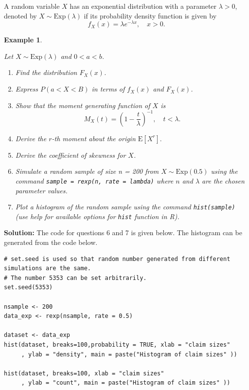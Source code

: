 \documentclass[landscape, 20pt]{extreport}
\theoremstyle{definition}
\theoremstyle{definition}
\newtheorem{example}{Example}[chapter]
\theoremstyle{definition}
\theoremstyle{definition}
\theoremstyle{remark}
\begin{document}
A random variable \(X\) has an exponential distribution with a parameter
\(\lambda > 0\), denoted by \(X \sim \text{Exp}(\lambda)\) if its
probability density function is given by
\[f_X(x) = \lambda e^{-\lambda x}, \quad x > 0.\]

\begin{example}
\protect\hypertarget{exm:unlabeled-div-28}{}\label{exm:unlabeled-div-28}

\emph{Let \(X \sim \text{Exp}(\lambda)\) and \(0 < a < b\).}

\begin{enumerate}
\def\labelenumi{\arabic{enumi}.}
\item
  \emph{Find the distribution \(F_X(x)\).}
\item
  \emph{Express \(P(a < X < B)\) in terms of \(f_X(x)\) and \(F_X(x)\).}
\item
  \emph{Show that the moment generating function of \(X\) is
  \[M_X(t) = \left(1 -  \frac{t}{\lambda}\right)^{-1}, \quad t < \lambda.\]}
\item
  \emph{Derive the \(r\)-th moment about the origin \(\mathrm{E}[X^r].\)}
\item
  \emph{Derive the coefficient of skewness for \(X\).}
\item
  \emph{Simulate a random sample of size n = 200 from
  \(X \sim \text{Exp}(0.5)\) using the command
  \texttt{sample\ =\ rexp(n,\ rate\ =\ lambda)} where \(n\) and \(\lambda\) are the chosen
  parameter values.}
\item
  \emph{Plot a histogram of the random sample using the command
  \texttt{hist(sample)} (use help for available options for \texttt{hist} function
  in R).}
\end{enumerate}

\end{example}

\textbf{Solution:}
The code for questions 6 and 7 is given below. The histogram can be generated from the code below.

\begin{verbatim}
# set.seed is used so that random number generated from different simulations are the same. 
# The number 5353 can be set arbitrarily. 
set.seed(5353)

nsample <- 200
data_exp <- rexp(nsample, rate = 0.5)

dataset <- data_exp
hist(dataset, breaks=100,probability = TRUE, xlab = "claim sizes" 
     , ylab = "density", main = paste("Histogram of claim sizes" ))

hist(dataset, breaks=100, xlab = "claim sizes" 
     , ylab = "count", main = paste("Histogram of claim sizes" ))
\end{verbatim}
\end{document}
